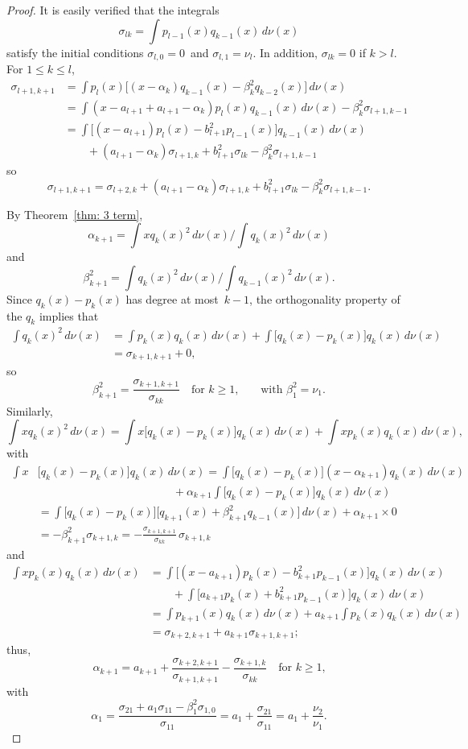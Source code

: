 \documentclass[12pt,a4paper]{article}
\begin{document}
\begin{proof}
It is easily verified that the integrals
\[
\sigma_{lk}=\int p_{l-1}(x)q_{k-1}(x)\,d\nu(x)
\]
satisfy the initial conditions $\sigma_{l,0}=0$~and 
$\sigma_{l,1}=\nu_l$.  In addition, $\sigma_{lk}=0$ if $k>l$. 
For $1\le k\le l$,
\begin{align*}
\sigma_{l+1,k+1}&=\int p_l(x)\bigl[
(x-\alpha_k)q_{k-1}(x)-\beta_k^2q_{k-2}(x)\bigr]\,d\nu(x)\\
	&=\int(x-a_{l+1}+a_{l+1}-\alpha_k)p_l(x)q_{k-1}(x)\,d\nu(x)
		-\beta_k^2\sigma_{l+1,k-1}\\
	&=\int\bigl[(x-a_{l+1})p_l(x)-b_{l+1}^2p_{l-1}(x)\bigr]
		q_{k-1}(x)\,d\nu(x)\\
	&\qquad{}+(a_{l+1}-\alpha_k)\sigma_{l+1,k}
		+b_{l+1}^2\sigma_{lk}-\beta_k^2\sigma_{l+1,k-1}
\end{align*}
so
\[
\sigma_{l+1,k+1}=\sigma_{l+2,k}+(a_{l+1}-\alpha_k)\sigma_{l+1,k}
		+b_{l+1}^2\sigma_{lk}-\beta_k^2\sigma_{l+1,k-1}.
\]

By Theorem~\ref{thm: 3 term},
\[
\alpha_{k+1}=\int xq_k(x)^2\,d\nu(x)\bigg/\int q_k(x)^2\,d\nu(x)
\]
and
\[
\beta_{k+1}^2=\int q_k(x)^2\,d\nu(x)\bigg/\int q_{k-1}(x)^2\,d\nu(x).
\]
Since $q_k(x)-p_k(x)$ has degree at most~$k-1$, the orthogonality 
property of the $q_k$ implies that
\begin{align*}
\int q_k(x)^2\,d\nu(x)&=\int p_k(x)q_k(x)\,d\nu(x)
	+\int\bigl[q_k(x)-p_k(x)\bigr]q_k(x)\,d\nu(x)\\
	&=\sigma_{k+1,k+1}+0,
\end{align*}
so
\[
\beta_{k+1}^2=\frac{\sigma_{k+1,k+1}}{\sigma_{kk}}
	\quad\text{for $k\ge1$,}
	\qquad\text{with $\beta_1^2=\nu_1$.}
\]
Similarly,
\[
\int x q_k(x)^2\,d\nu(x)
	=\int x\bigl[q_k(x)-p_k(x)\bigr]q_k(x)\,d\nu(x)
	+\int xp_k(x)q_k(x)\,d\nu(x),
\]
with
\begin{align*}
\int x&\bigl[q_k(x)-p_k(x)\bigr]q_k(x)\,d\nu(x)
	=\int\bigl[q_k(x)-p_k(x)\bigr](x-\alpha_{k+1})q_k(x)\,d\nu(x)\\
	&\qquad\qquad\qquad\qquad\qquad\qquad{}+\alpha_{k+1}\int 
		\bigl[q_k(x)-p_k(x)\bigr]q_k(x)\,d\nu(x)\\
	&=\int\bigl[q_k(x)-p_k(x)\bigr]
	\bigl[q_{k+1}(x)+\beta_{k+1}^2 q_{k-1}(x)\bigr] 
		\,d\nu(x)+\alpha_{k+1}\times0\\
	&=-\beta_{k+1}^2\sigma_{k+1,k}
	=-\frac{\sigma_{k+1,k+1}}{\sigma_{kk}}\,\sigma_{k+1,k}
\end{align*}
and
\begin{align*}
\int xp_k(x)q_k(x)\,d\nu(x)&=\int\bigl[
	(x-a_{k+1})p_k(x)-b_{k+1}^2p_{k-1}(x)\bigr]q_k(x)\,d\nu(x)\\
	&\qquad{}+\int\bigl[
		a_{k+1}p_k(x)+b_{k+1}^2p_{k-1}(x)\bigr]q_k(x)\,d\nu(x)\\
	&=\int p_{k+1}(x)q_k(x)\,d\nu(x)
		+a_{k+1}\int p_k(x)q_k(x)\,d\nu(x)\\
	&=\sigma_{k+2,k+1}+a_{k+1}\sigma_{k+1,k+1};
\end{align*}
thus,
\[
\alpha_{k+1}=a_{k+1}+\frac{\sigma_{k+2,k+1}}{\sigma_{k+1,k+1}}
	-\frac{\sigma_{k+1,k}}{\sigma_{kk}}
	\quad\text{for $k\ge1$,}
\]
with
\[
\alpha_1=\frac{\sigma_{21}+a_1\sigma_{11}-\beta_1^2\sigma_{1,0}}%
{\sigma_{11}}=a_1+\frac{\sigma_{21}}{\sigma_{11}}
	=a_1+\frac{\nu_2}{\nu_1}.
\]
\end{proof}
\end{document}
